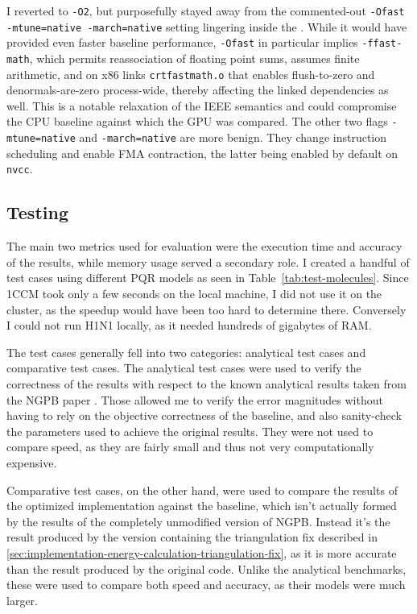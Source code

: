 I reverted to \texttt{-O2}, but purposefully stayed away from the commented-out \texttt{-Ofast -mtune=native -march=native} setting lingering inside the . While it would have provided even faster baseline performance, \texttt{-Ofast} in particular implies \texttt{-ffast-math}, which permits reassociation of floating point sums, assumes finite arithmetic, and on x86 links \texttt{crtfastmath.o} that enables flush-to-zero and denormals-are-zero process-wide, thereby affecting the linked dependencies as well.
This is a notable relaxation of the IEEE semantics and could compromise the CPU baseline against which the GPU was compared.
The other two flags \texttt{-mtune=native} and \texttt{-march=native} are more benign. They change instruction scheduling and enable FMA contraction, the latter being enabled by default on \texttt{nvcc}.

\subsection{Testing}
\label{sec:evaluation-experimental-setup-testing}

The main two metrics used for evaluation were the execution time and accuracy of the results, while memory usage served a secondary role. 
I created a handful of test cases using different PQR models as seen in Table~\ref{tab:test-molecules}.
Since 1CCM took only a few seconds on the local machine, I did not use it on the cluster, as the speedup would have been too hard to determine there.
Conversely I could not run H1N1 locally, as it needed hundreds of gigabytes of RAM.

The test cases generally fell into two categories: analytical test cases and comparative test cases.
The analytical test cases were used to verify the correctness of the results with respect to the known analytical results taken from the NGPB paper \cite{diflorio2025nextgenpb}. 
Those allowed me to verify the error magnitudes without having to rely on the objective correctness of the baseline, and also sanity-check the parameters used to achieve the original results.
They were not used to compare speed, as they are fairly small and thus not very computationally expensive.

Comparative test cases, on the other hand, were used to compare the results of the optimized implementation against the baseline, which isn't actually formed by the results of the completely unmodified version of NGPB. 
Instead it's the result produced by the version containing the triangulation fix described in \ref{sec:implementation-energy-calculation-triangulation-fix}, as it is more accurate than the result produced by the original code.
Unlike the analytical benchmarks, these were used to compare both speed and accuracy, as their models were much larger.

